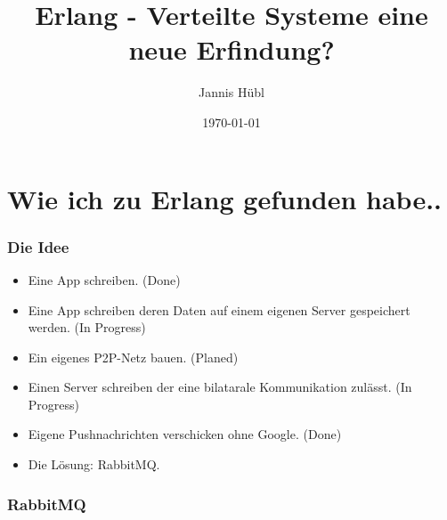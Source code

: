 \documentclass{beamer}
\title{Erlang - Verteilte Systeme eine neue Erfindung?}
\author{Jannis Hübl}
\date{\today}
\begin{document}
\maketitle
\frame{\tableofcontents[currentsection]}
 
\section{Wie ich zu Erlang gefunden habe..}
\begin{frame} %
  \frametitle{Die Idee} %
  \begin{itemize} %
     \item Eine App schreiben. (Done)
     \item Eine App schreiben deren Daten auf einem eigenen Server gespeichert werden. (In Progress)
     \item Ein eigenes P2P-Netz bauen. (Planed) 
     \item Einen Server schreiben der eine bilatarale Kommunikation zulässt. (In Progress)
     \item Eigene Pushnachrichten verschicken ohne Google. (Done)
     \item Die Lösung: RabbitMQ.
  \end{itemize}
\end{frame}


\begin{frame} 
  \frametitle{RabbitMQ}
\end{frame}
\end{document}
